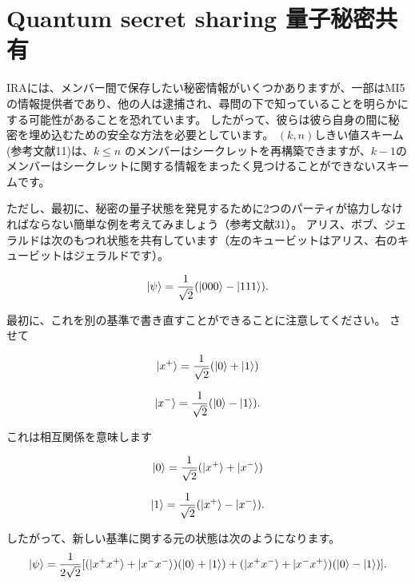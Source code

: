 \section{Quantum secret sharing 量子秘密共有}

IRAには、メンバー間で保存したい秘密情報がいくつかありますが、一部はMI5の情報提供者であり、他の人は逮捕され、尋問の下で知っていることを明らかにする可能性があることを恐れています。
したがって、彼らは彼ら自身の間に秘密を埋め込むための安全な方法を必要としています。
$(k,n)$しきい値スキーム(参考文献11)は、$ k \le n$ のメンバーはシークレットを再構築できますが、$k-1$のメンバーはシークレットに関する情報をまったく見つけることができないスキームです。

ただし、最初に、秘密の量子状態を発見するために2つのパーティが協力しなければならない簡単な例を考えてみましょう（参考文献31）。 アリス、ボブ、ジェラルドは次のもつれ状態を共有しています（左のキュービットはアリス、右のキュービットはジェラルドです）。

\begin{equation}
\label{205}
\ket{\psi} = \frac{1}{\sqrt{2}}(\ket{000}-\ket{111}).
\end{equation}

最初に、これを別の基準で書き直すことができることに注意してください。 させて

\begin{equation}
\label{206}
\ket{x^{+}} = \frac{1}{\sqrt{2}}(\ket{0}+\ket{1})
\end{equation}

\begin{equation}
\label{207}
\ket{x^{-}} = \frac{1}{\sqrt{2}}(\ket{0}-\ket{1}).
\end{equation}

これは相互関係を意味します

\begin{equation}
\label{208}
\ket{0} = \frac{1}{\sqrt{2}}(\ket{x^+}+\ket{x^-})
\end{equation}

\begin{equation}
\label{209}
\ket{1} = \frac{1}{\sqrt{2}}(\ket{x^+}-\ket{x^-}).
\end{equation}

したがって、新しい基準に関する元の状態は次のようになります。
\begin{equation}
\label{210}
\ket{\psi} = \frac{1}{2\sqrt{2}}[(\ket{x^+ x^+}+\ket{x^- x^-})(\ket{0}+\ket{1})+  (\ket{x^+ x^-}+\ket{x^- x^+})(\ket{0}-\ket{1})].
\end{equation}


